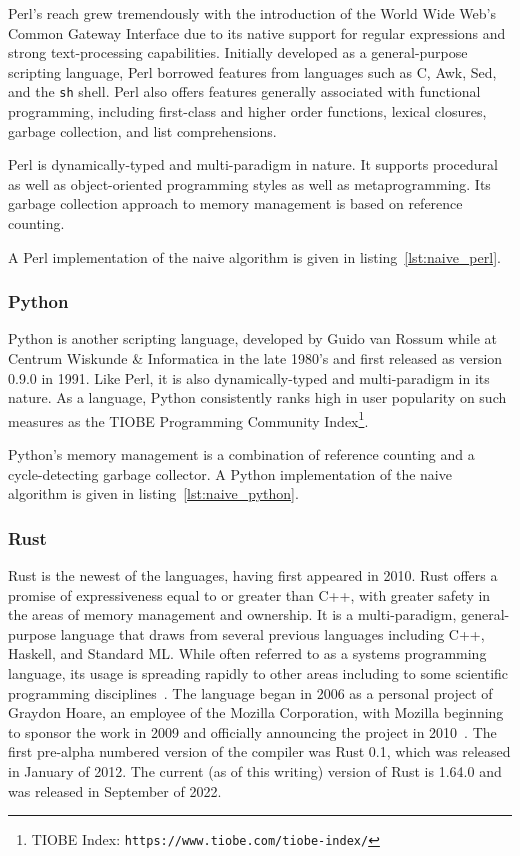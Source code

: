 Perl's reach grew tremendously with the introduction of the World Wide Web's Common Gateway Interface due to its native support for regular expressions and strong text-processing capabilities. Initially developed as a general-purpose scripting language, Perl borrowed features from languages such as C, Awk, Sed, and the \texttt{sh} shell. Perl also offers features generally associated with functional programming, including first-class and higher order functions, lexical closures, garbage collection, and list comprehensions.

Perl is dynamically-typed and multi-paradigm in nature. It supports procedural as well as object-oriented programming styles as well as metaprogramming. Its garbage collection approach to memory management is based on reference counting.

A Perl implementation of the naive algorithm is given in listing~\ref{lst:naive_perl}.



\subsubsection{Python}

Python is another scripting language, developed by Guido van Rossum while at Centrum Wiskunde \& Informatica in the late 1980's and first released as version 0.9.0 in 1991. Like Perl, it is also dynamically-typed and multi-paradigm in its nature. As a language, Python consistently ranks high in user popularity on such measures as the TIOBE Programming Community Index\footnote{TIOBE Index: \texttt{https://www.tiobe.com/tiobe-index/}}.

Python's memory management is a combination of reference counting and a cycle-detecting garbage collector. A Python implementation of the naive algorithm is given in listing~\ref{lst:naive_python}.



\subsubsection{Rust}

Rust is the newest of the languages, having first appeared in 2010. Rust offers a promise of expressiveness equal to or greater than C++, with greater safety in the areas of memory management and ownership. It is a multi-paradigm, general-purpose language that draws from several previous languages including C++, Haskell, and Standard ML. While often referred to as a systems programming language, its usage is spreading rapidly to other areas including to some scientific programming disciplines~\cite{nature.rust.2020}. The language began in 2006 as a personal project of Graydon Hoare, an employee of the Mozilla Corporation, with Mozilla beginning to sponsor the work in 2009 and officially announcing the project in 2010~\cite{asay.2021}. The first pre-alpha numbered version of the compiler was Rust 0.1, which was released in January of 2012. The current (as of this writing) version of Rust is 1.64.0 and was released in September of 2022.

